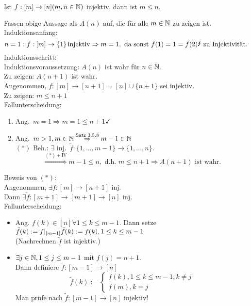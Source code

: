 \documentclass[../ana1.tex]{subfiles}
\begin{document}
\begin{satz}[Schubfachprinzip]
	Ist \(f:[m]\rightarrow [n] (m,n\in\mathbb{N}) \) injektiv, dann ist \(m\leq n\).
\end{satz}
\begin{bew}
	Fassen obige Aussage als \(A(n)\) auf, die für alle \(m\in\mathbb{N} \) zu zeigen ist.\\
	Induktionsanfang:
	\[ n=1: f:[m] \rightarrow \{1\} \injektiv \Rightarrow m=1, \text{ da sonst } f(1) = 1 = f(2) \text{\Lightning{} zu Injektivität}.\]
	Induktionsschritt:\\
	Induktionsvoraussetzung: \(A(n)\) ist wahr für \(n\in\mathbb{N} \).\\
	Zu zeigen: \(A(n+1)\) ist wahr.\\
	Angenommen, \(f:[m]\rightarrow[n+1] = [n] \cup \{n+1\} \) sei injektiv.\\
	Zu zeigen: \(m\leq n+1\) \\
	Fallunterscheidung:
	\begin{enumerate}
		\item Ang.\  \(m=1 \Rightarrow m=1\leq n+1\checkmark{}\)
		\item Ang.\  \(m>1, m\in\mathbb{N} \overset{\text{Satz 3.5.8}}{\Rightarrow} m-1\in\mathbb{N} \) \\
		      \((*)\) Beh.: \(\exists \) inj.\  \(\tilde{f}: \{1,\ldots,m-1\}\rightarrow \{1,\ldots,n\} \).\\
		      \[ \overset{(*) + \text{IV}}{\Rightarrow} m-1\leq n, \text{ d.h. } m\leq n+1 \Rightarrow A(n+1) \text{ ist wahr}.\]
	\end{enumerate}
	Beweis von \((*)\):\\
	Angenommen, \(\exists f: [m]\rightarrow[n+1]\) inj.\\
	Dann \(\exists \tilde{f}: [m+1]\rightarrow [m+1]\rightarrow[n]\) inj.\\
	Fallunterscheidung:
	\begin{itemize}
		\item Ang. \(f(k)\in [n] \forall 1\leq k \leq m-1\). Dann setze \(\tilde{f}(k) := f\vert_{[m-1]}\\
			  \tilde{f}(k) := f(k), 1\leq k\leq m-1\) \\
		      (Nachrechnen \(\tilde{f}\) ist injektiv.)
		\item \(\exists j\in\mathbb{N}, 1\leq j\leq m-1\) mit \(f(j) = n+1\).\\
		      Dann definiere \(\tilde{f}: [m-1]\rightarrow [n]\)
		      \[\tilde{f}(k) :=
			      	\begin{cases}
				    	f(k), 1 \leq k \leq m-1, k\neq j \\
				      	f(m), k=j
			      	\end{cases}\]
		      Man prüfe nach \(\tilde{f}: [m-1]\rightarrow [n]\) injektiv!
	\end{itemize}
\end{bew}
\end{document}

